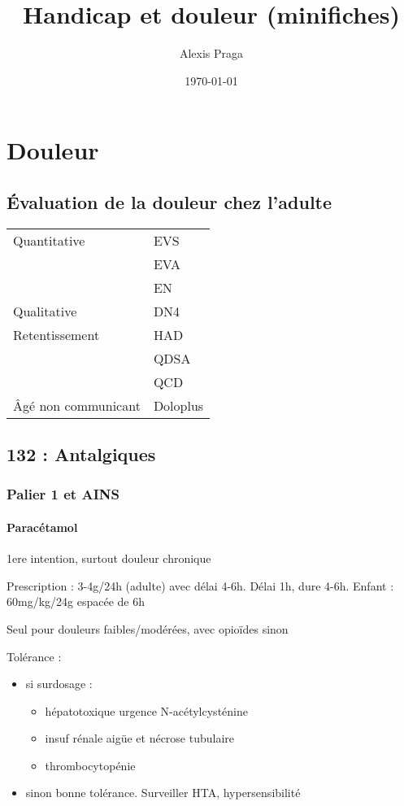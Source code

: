 \documentclass[11pt]{article}
\author{Alexis Praga}
\date{\today}
\title{Handicap et douleur (minifiches)}
\begin{document}
\maketitle
\tableofcontents



\section{Douleur}
\label{sec:org8c0ca94}

\subsection{Évaluation de la douleur chez l'adulte}
\label{sec:orgf2479e6}
\begin{center}
\begin{tabular}{ll}
\toprule
Quantitative & \gls{EVS}\\
 & \gls{EVA}\\
 & \gls{EN}\\
Qualitative & DN4\\
Retentissement & \gls{HAD}\\
 & \gls{QDSA}\\
 & \gls{QCD}\\
Âgé non communicant & Doloplus\\
\bottomrule
\end{tabular}
\end{center}
\subsection{132 : Antalgiques}
\label{sec:org7d24202}
\subsubsection{Palier 1 et AINS}
\label{sec:org01d3169}
\paragraph{Paracétamol}
\label{sec:orgc1786df}
1ere intention, surtout douleur chronique

Prescription : 3-4g/24h (adulte) avec délai 4-6h. Délai 1h, dure 4-6h. Enfant : 60mg/kg/24g
espacée de 6h 

Seul pour douleurs faibles/modérées, avec opioïdes sinon

Tolérance :
\begin{itemize}
\item si surdosage : 
\begin{itemize}
\item hépatotoxique \thus urgence \skull \thus N-acétylcysténine
\item insuf rénale aigüe et nécrose tubulaire
\item thrombocytopénie
\end{itemize}
\item sinon bonne tolérance. Surveiller HTA, hypersensibilité
\end{itemize}
\end{document}
